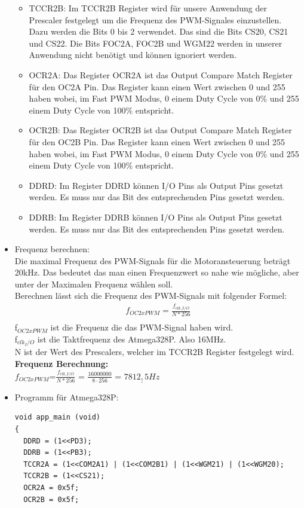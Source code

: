 \begin{itemize}
\begin{itemize}
\begin{itemize}
\end{itemize} 
\item TCCR2B: Im TCCR2B Register wird für unsere Anwendung der Prescaler festgelegt um die Frequenz des PWM-Signales einzustellen. Dazu werden die Bits 0 bis 2 verwendet. Das sind die Bits CS20, CS21 und CS22. Die Bits FOC2A, FOC2B und WGM22 werden in unserer Anwendung nicht benötigt und können ignoriert werden. \\
\item OCR2A: Das Register OCR2A ist das Output Compare Match Register für den OC2A Pin. Das Register kann einen Wert zwischen 0 und 255 haben wobei, im Fast PWM Modus, 0 einem Duty Cycle von 0\% und 255 einem Duty Cycle von 100\% entspricht.\\
\item OCR2B: Das Register OCR2B ist das Output Compare Match Register für den OC2B Pin. Das Register kann einen Wert zwischen 0 und 255 haben wobei, im Fast PWM Modus, 0 einem Duty Cycle von 0\% und 255 einem Duty Cycle von 100\% entspricht.\\
\item DDRD: Im Register DDRD können I/O Pins als Output Pins gesetzt werden. Es muss nur das Bit des entsprechenden Pins gesetzt werden.\\
\item DDRB: Im Register DDRB können I/O Pins als Output Pins gesetzt werden. Es muss nur das Bit des entsprechenden Pins gesetzt werden.\\
\end{itemize}
\item Frequenz berechnen:\\
Die maximal Frequenz des PWM-Signals für die Motoransteuerung beträgt 20kHz. Das bedeutet das man einen Frequenzwert so nahe wie mögliche, aber unter der Maximalen Frequenz wählen soll.\\
Berechnen lässt sich die Frequenz des PWM-Signals mit folgender Formel:
\begin{align*}
f_{OC2xPWM}=\frac{f_{clk\_I/O}}{N*256} \\
\end{align*} 
f$_{OC2xPWM}$ ist die Frequenz die das PWM-Signal haben wird.\\
f$_{clk_I/O}$ ist die Taktfrequenz des Atmega328P. Also 16MHz. \\
N ist der Wert des Prescalers, welcher im TCCR2B Register festgelegt wird. \\

\textbf{Frequenz Berechnung:}\\
$f_{OC2xPWM}$=$\frac{f_{clk\_I/O}}{N*256}$ = $\frac{16000000}{8 \cdot 256}$ = $\underline{7812,5Hz}$
\item Programm für Atmega328P: \\
\begin{lstlisting}[caption=$\mu$C-Programm,style=C]
void app_main (void)
{
  DDRD = (1<<PD3);
  DDRB = (1<<PB3);
  TCCR2A = (1<<COM2A1) | (1<<COM2B1) | (1<<WGM21) | (1<<WGM20);
  TCCR2B = (1<<CS21);
  OCR2A = 0x5f;
  OCR2B = 0x5f;
  

\end{lstlisting}
\end{itemize}
